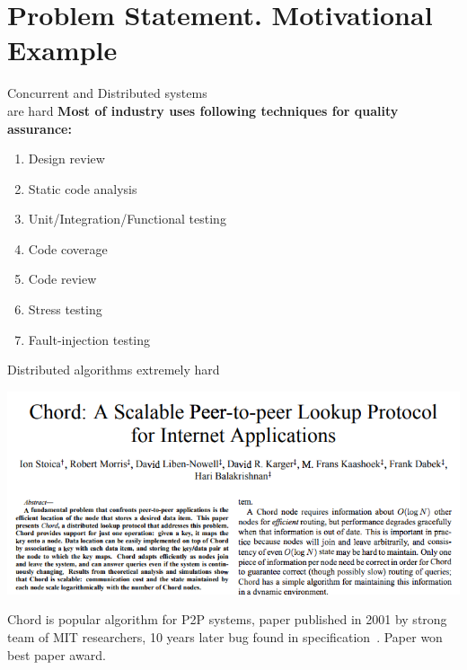 \documentclass[12pt]{beamer}
\begin{document}
  \section{Problem Statement. Motivational Example}
  \begin{frame}{Concurrent and Distributed systems \\ are hard}
      \textbf{Most of industry uses following techniques for quality assurance:}
      \begin{enumerate}
          \item Design review
          \item Static code analysis
          \item Unit/Integration/Functional testing
          \item Code coverage
          \item Code review
          \item Stress testing
          \item Fault-injection testing \cite{principlesofchaos}
      \end{enumerate}
  \end{frame}
  \begin{frame}{Distributed algorithms extremely hard}
      \begin{center}
          \includegraphics[scale=0.3]{figures/chord_paper.png}
      \end{center}
      \begin{alertblock}{Chord}
          is popular algorithm for P2P systems, paper published in
          2001 by strong team of MIT researchers, 10 years later bug found
          in specification~\cite{stoica2001chord, Zave15}. Paper won best
          paper award.
      \end{alertblock}
  \end{frame}
\end{document}
